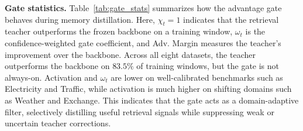 

\noindent\textbf{Gate statistics.}
Table~\ref{tab:gate_stats} summarizes how the advantage gate behaves during memory distillation. 
Here, $\chi_t{=}1$ indicates that the retrieval teacher outperforms the frozen backbone on a training window, $\omega_t$ is the confidence-weighted gate coefficient, and Adv. Margin measures the teacher's improvement over the backbone. 
Across all eight datasets, the teacher outperforms the backbone on $83.5\%$ of training windows, but the gate is not always-on. 
Activation and $\omega_t$ are lower on well-calibrated benchmarks such as Electricity and Traffic, while activation is much higher on shifting domains such as Weather and Exchange. 
This indicates that the gate acts as a domain-adaptive filter, selectively distilling useful retrieval signals while suppressing weak or uncertain teacher corrections.

